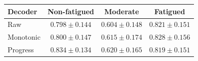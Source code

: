 \begin{tabular}{lccc}
\toprule
Decoder & Non-fatigued & Moderate & Fatigued \\
\midrule
Raw & $0.798 \pm 0.144$ & $0.604 \pm 0.148$ & $0.821 \pm 0.151$ \\
Monotonic & $0.800 \pm 0.147$ & $0.615 \pm 0.174$ & $0.828 \pm 0.156$ \\
Progress & $0.834 \pm 0.134$ & $0.620 \pm 0.165$ & $0.819 \pm 0.151$ \\
\bottomrule
\end{tabular}